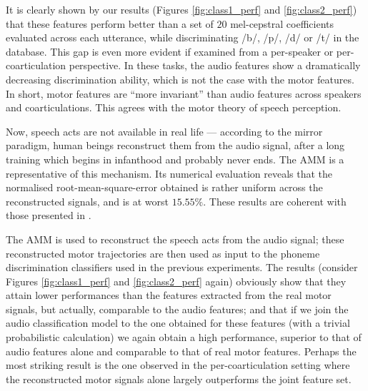 It is clearly shown by our results (Figures \ref{fig:class1_perf}
and \ref{fig:class2_perf}) that these features perform
better than a set of $20$ mel-cepstral coefficients evaluated across each utterance,
while discriminating /b/, /p/, /d/ or /t/ in the database. This gap is even
more evident if examined from a per-speaker or per-coarticulation perspective.
In these tasks, the audio features show a dramatically decreasing discrimination
ability, which is not the case with the motor features. In short, motor features
are ``more invariant'' than audio features across speakers and coarticulations.
This agrees with the motor theory of speech perception.

Now, speech acts are not available in real life --- according to the mirror
paradigm, human beings reconstruct them from the audio signal, after a long
training which begins in infanthood and probably never ends. The AMM is a
representative of this mechanism. Its numerical evaluation
reveals that the normalised root-mean-square-error obtained is rather
uniform across the reconstructed signals, and is at worst $15.55\%$. These
results are coherent with those presented in \cite{papcun,richmond2002,richmond2007}.




The AMM is used to reconstruct the speech acts from the audio signal; these
reconstructed motor trajectories are then used as input to the phoneme
discrimination classifiers used in the previous experiments. The results
(consider Figures \ref{fig:class1_perf} and \ref{fig:class2_perf} again)
obviously show that they attain lower performances than the features
extracted from the real motor signals, but actually, comparable
to the audio features; and that if we join the audio classification model
to the one obtained for these features (with a trivial probabilistic calculation)
we again obtain a high performance, superior to that of audio features alone
and comparable to that of real motor features. Perhaps the most striking result 
is the one observed in the per-coarticulation setting where the reconstructed motor
signals alone largely outperforms the joint feature set. 


